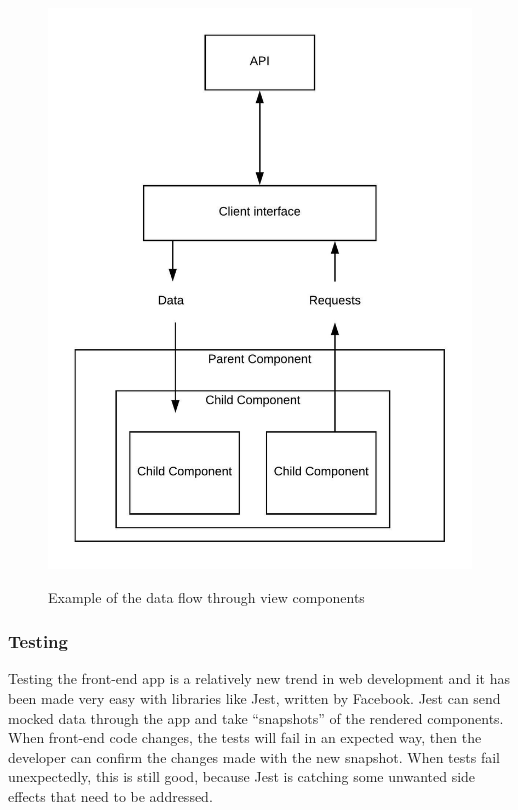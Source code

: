     \begin{figure}[H]
        \centering
        \caption{Example of the data flow through view components}
        \includegraphics[origin=c]{./diagrams/front-end-diagram.jpeg}
        \label{front-end}
    \end{figure}
    
    \subsubsection{Testing}
    Testing the front-end app is a relatively new trend in web development and it has been made very easy with libraries like Jest, written by Facebook. Jest can send mocked data through the app and take “snapshots” of the rendered components. When front-end code changes, the tests will fail in an expected way, then the developer can confirm the changes made with the new snapshot. When tests fail unexpectedly, this is still good, because Jest is catching some unwanted side effects that need to be addressed.

